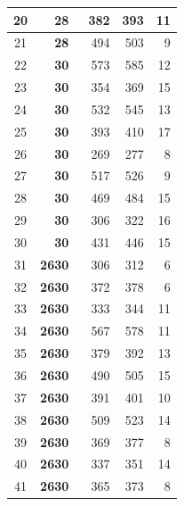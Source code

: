 \documentclass{article}
\def\TWO{\bf\textcolor{G}{28}}
\def\THR{\bf\textcolor{B}{30}}
\def\FOR{\bf\textcolor{A}{26\text{-}30}}
\begin{document}
\begin{longtable}[c]{|c|r|r|r|r|}
    20 & \TWO\ & 382 & 393 & 11\\\midrule
    21 & \TWO\ & 494 & 503 & 9\\
  \midrule%
    22 & \THR\ & 573 & 585 & 12\\\midrule
    23 & \THR\ & 354 & 369 & 15\\\midrule
    24 & \THR\ & 532 & 545 & 13\\\midrule
    25 & \THR\ & 393 & 410 & 17\\\midrule
    26 & \THR\ & 269 & 277 & 8\\\midrule
    27 & \THR\ & 517 & 526 & 9\\\midrule
    28 & \THR\ & 469 & 484 & 15\\\midrule
    29 & \THR\ & 306 & 322 & 16\\\midrule
    30 & \THR\ & 431 & 446 & 15\\
  \midrule%
    31 & \FOR\ & 306 & 312 & 6\\\midrule
    32 & \FOR\ & 372 & 378 & 6\\\midrule
    33 & \FOR\ & 333 & 344 & 11\\\midrule
    34 & \FOR\ & 567 & 578 & 11\\\midrule
    35 & \FOR\ & 379 & 392 & 13\\\midrule
    36 & \FOR\ & 490 & 505 & 15\\\midrule
    37 & \FOR\ & 391 & 401 & 10\\\midrule
    38 & \FOR\ & 509 & 523 & 14\\\midrule
    39 & \FOR\ & 369 & 377 & 8\\\midrule
    40 & \FOR\ & 337 & 351 & 14\\\midrule
    41 & \FOR\ & 365 & 373 & 8\\
  \bottomrule
\end{longtable}
\begin{center}
  \\
  \\
  \\
  \\
\end{center}
\end{document}

